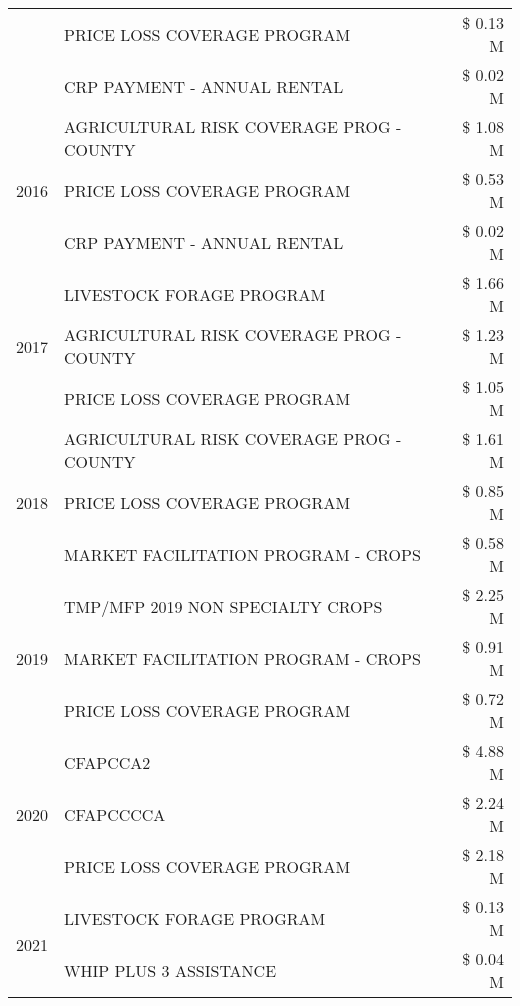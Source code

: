 \begin{tabular}{llr}
 & PRICE LOSS COVERAGE PROGRAM & \$ 0.13 M \\
 & CRP PAYMENT - ANNUAL RENTAL & \$ 0.02 M \\
\cline{1-3}
\multirow[t]{3}{*}{2016} & AGRICULTURAL RISK COVERAGE PROG - COUNTY & \$ 1.08 M \\
 & PRICE LOSS COVERAGE PROGRAM & \$ 0.53 M \\
 & CRP PAYMENT - ANNUAL RENTAL & \$ 0.02 M \\
\cline{1-3}
\multirow[t]{3}{*}{2017} & LIVESTOCK FORAGE PROGRAM & \$ 1.66 M \\
 & AGRICULTURAL RISK COVERAGE PROG - COUNTY & \$ 1.23 M \\
 & PRICE LOSS COVERAGE PROGRAM & \$ 1.05 M \\
\cline{1-3}
\multirow[t]{3}{*}{2018} & AGRICULTURAL RISK COVERAGE PROG - COUNTY & \$ 1.61 M \\
 & PRICE LOSS COVERAGE PROGRAM & \$ 0.85 M \\
 & MARKET FACILITATION PROGRAM - CROPS & \$ 0.58 M \\
\cline{1-3}
\multirow[t]{3}{*}{2019} & TMP/MFP 2019 NON SPECIALTY CROPS & \$ 2.25 M \\
 & MARKET FACILITATION PROGRAM - CROPS & \$ 0.91 M \\
 & PRICE LOSS COVERAGE PROGRAM & \$ 0.72 M \\
\cline{1-3}
\multirow[t]{3}{*}{2020} & CFAPCCA2 & \$ 4.88 M \\
 & CFAPCCCCA & \$ 2.24 M \\
 & PRICE LOSS COVERAGE PROGRAM & \$ 2.18 M \\
\cline{1-3}
\multirow[t]{2}{*}{2021} & LIVESTOCK FORAGE PROGRAM & \$ 0.13 M \\
 & WHIP PLUS 3 ASSISTANCE & \$ 0.04 M \\
\cline{1-3}
\bottomrule
\end{tabular}
